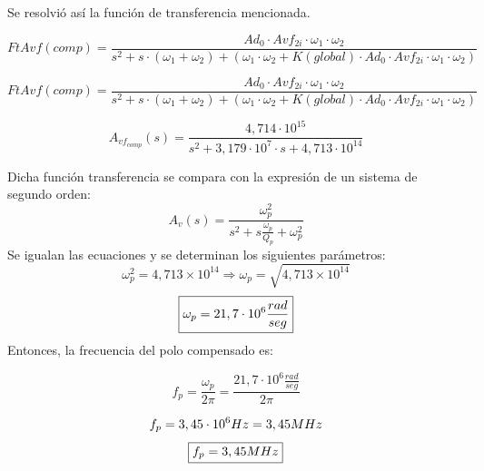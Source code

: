 \bigskip
\hspace{1mm} Se resolvió así la función de transferencia mencionada.

\begin{equation}
    FtAvf (comp) = \frac{Ad_0 \cdot Avf_{2i} \cdot \omega_1 \cdot \omega_2}{s^2 + s \cdot (\omega_1 + \omega_2) + (\omega_1 \cdot \omega_2 + K (global) \cdot Ad_0 \cdot Avf_{2i} \cdot \omega_1 \cdot \omega_2)}
\end{equation}

\begin{equation}
    FtAvf (comp) = \frac{Ad_0 \cdot Avf_{2i} \cdot \omega_1 \cdot \omega_2}{s^2 + s \cdot (\omega_1 + \omega_2) + (\omega_1 \cdot \omega_2 + K (global) \cdot Ad_0 \cdot Avf_{2i} \cdot \omega_1 \cdot \omega_2)}
\end{equation}

\begin{equation}
    A_{vf_{comp}}(s) = \frac{4,714 \cdot 10^{15}}{s^2 + 3,179 \cdot 10^7 \cdot s + 4,713 \cdot 10^{14}}
\end{equation}

\bigskip
\hspace{1mm} Dicha función transferencia se compara con la expresión de un sistema de segundo orden:
\begin{equation}
    A_{v}(s) = \frac{\omega _p^2}{s^2 + s \frac{\omega _p}{Q_p } + \omega_p^2}
\end{equation}  
\bigskip
\hspace{1mm} Se igualan las ecuaciones y se determinan los siguientes parámetros:
\begin{equation}
    \omega _p ^2 = 4,713 \times 10^{14} \Longrightarrow \omega_p =\sqrt{4,713 \times 10^{14}} 
\end{equation}
\begin{equation}
    \boxed{
        \omega_p = 21,7 \cdot 10^6 \space \frac{rad}{seg} 
    }
\end{equation}
\bigskip
\hspace{1mm} Entonces, la frecuencia del polo compensado es:

\begin{equation}
    f_p = \frac{\omega_p}{2\pi}=\frac{21,7 \cdot 10^6 \frac{rad}{seg}}{2\pi}
\end{equation}

\begin{equation}
    f_p = 3,45\cdot 10^6 \space Hz= 3,45\space MHz
\end{equation}
\begin{equation}
    \boxed{
    f_p = 3,45\space MHz
    }
\end{equation}

